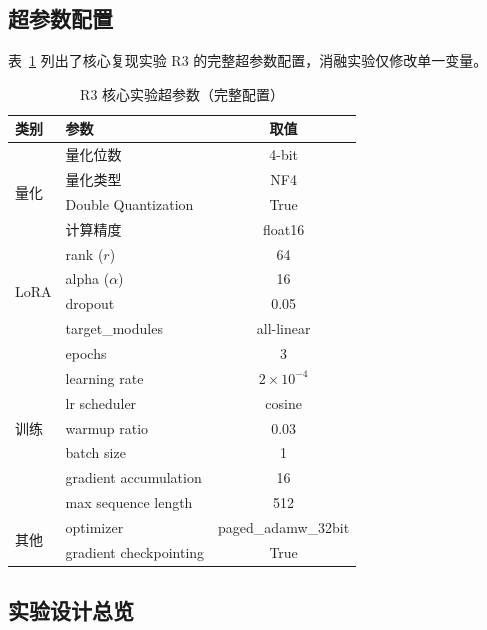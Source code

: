 \documentclass[12pt,a4paper]{article}
\begin{document}
\subsection{超参数配置}

表~\ref{tab:hyperparams} 列出了核心复现实验 R3 的完整超参数配置，消融实验仅修改单一变量。

\begin{table}[H]
\centering
\caption{R3 核心实验超参数（完整配置）}
\label{tab:hyperparams}
\begin{tabular}{llc}
\toprule
\textbf{类别} & \textbf{参数} & \textbf{取值} \\
\midrule
\multirow{4}{*}{量化} & 量化位数 & 4-bit \\
 & 量化类型 & NF4 \\
 & Double Quantization & True \\
 & 计算精度 & float16 \\
\midrule
\multirow{4}{*}{LoRA} & rank ($r$) & 64 \\
 & alpha ($\alpha$) & 16 \\
 & dropout & 0.05 \\
 & target\_modules & all-linear \\
\midrule
\multirow{7}{*}{训练} & epochs & 3 \\
 & learning rate & $2 \times 10^{-4}$ \\
 & lr scheduler & cosine \\
 & warmup ratio & 0.03 \\
 & batch size & 1 \\
 & gradient accumulation & 16 \\
 & max sequence length & 512 \\
\midrule
\multirow{2}{*}{其他} & optimizer & paged\_adamw\_32bit \\
 & gradient checkpointing & True \\
\bottomrule
\end{tabular}
\end{table}

\subsection{实验设计总览}
\end{document}
